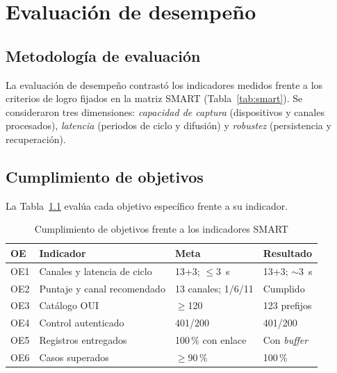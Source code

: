 \chapter{Evaluación de desempeño}
\label{cap:desempeno}

\section{Metodología de evaluación}
La evaluación de desempeño contrastó los indicadores medidos frente a los criterios de logro fijados en la matriz SMART (Tabla~\ref{tab:smart}). Se consideraron tres dimensiones: \emph{capacidad de captura} (dispositivos y canales procesados), \emph{latencia} (periodos de ciclo y difusión) y \emph{robustez} (persistencia y recuperación).

\section{Cumplimiento de objetivos}
La Tabla~\ref{tab:cumplimiento} evalúa cada objetivo específico frente a su indicador.

\begin{table}[H]
\centering
\caption{Cumplimiento de objetivos frente a los indicadores SMART}
\label{tab:cumplimiento}
\footnotesize
\begin{tabularx}{\linewidth}{@{}l X l l@{}}
\toprule
\textbf{OE} & \textbf{Indicador} & \textbf{Meta} & \textbf{Resultado} \\
\midrule
OE1 & Canales y latencia de ciclo & 13+3; $\le$3~s & 13+3; $\sim$3~s \\
OE2 & Puntaje y canal recomendado & 13 canales; 1/6/11 & Cumplido \\
OE3 & Catálogo OUI & $\ge$120 & 123 prefijos \\
OE4 & Control autenticado & 401/200 & 401/200 \\
OE5 & Registros entregados & 100\,\% con enlace & Con \emph{buffer} \\
OE6 & Casos superados & $\ge$90\,\% & 100\,\% \\
\bottomrule
\end{tabularx}
\end{table}

